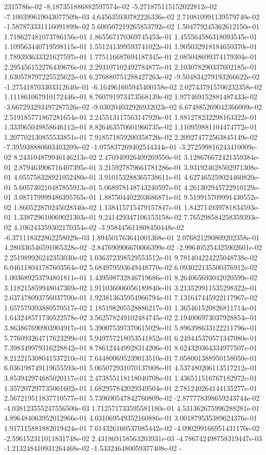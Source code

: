 2315786e-02	-8.187351886882597574e-02	-5.271875115152022812e-02	-7.100399619043077509e-03	4.645635930782226336e-02	2.710810991139579740e-02	-1.587873331116091899e-02	5.600507219265853792e-02	1.504779245362612150e-01	1.718627481073786156e-01	1.865567170369745453e-01	1.455564586318093545e-01	1.109563440719598115e-01	1.551241399593741022e-01	1.905032918184650370e-01	1.789393633321627597e-01	1.775116687694187345e-01	2.085048699374179304e-01	2.295456152276439676e-01	2.293107102492784877e-01	2.103078290337602185e-01	1.630578797225525622e-01	6.276880751288427263e-02	-9.504834279193266622e-02	-1.275418703303312640e-01	-6.164961605945400158e-02	2.027437915706232358e-02	1.111861067910172446e-01	8.760791973473568139e-02	1.977469152881487433e-02	-3.667293293497287526e-02	-9.030204032926932023e-02	6.674885269042366009e-02	2.519185771867281654e-01	2.245513117563147920e-01	1.881278232298163322e-01	1.333965049858646112e-01	8.826463570601966735e-02	1.110959881104474772e-01	1.207702130855533851e-01	7.918571859200358720e-02	2.209274772563845149e-02	-7.395938880603403209e-02	-1.075837269402544344e-01	-3.272599816243410009e-02	8.243104879946146213e-02	2.476940926409269550e-01	3.128676672421359384e-01	2.879463906716407395e-01	3.215927879661781286e-01	3.931924628502971308e-01	4.055758328921052480e-01	3.910153288365738611e-01	4.627465259024460820e-01	5.605730210487855913e-01	5.068978148743240597e-01	4.261302945722910129e-01	3.087179999486395765e-01	1.887504402203686871e-01	9.519915709991430552e-02	1.860522870245028340e-02	1.138415715479157847e-01	1.842714939781834593e-01	1.338729610069021303e-01	9.241429347106153158e-02	7.765298584258359393e-02	4.106243359302170354e-02	-3.958445611808450448e-02	-6.371118322862258029e-03	1.894501763641001368e-01	2.076821290809202358e-01	4.280336546591065328e-02	-2.847690906670066399e-02	-2.996405254325902601e-02	2.251989926242353030e-02	1.036372398529553512e-01	9.781404224225048738e-02	6.046118041787603564e-02	5.684979593649448770e-02	6.093022135500376912e-02	1.003689253794801811e-01	1.439598732846719686e-01	8.264065693042020599e-02	3.118215859948047369e-02	1.911036006056189840e-01	3.213529911535298322e-01	2.637478093756037700e-01	1.923813635954966794e-01	7.131647445922117967e-02	1.657579393880570517e-02	1.185198205528886217e-01	1.365461520826811714e-01	1.643248571730522578e-02	3.562578249102484745e-02	2.194006973037928854e-01	3.863867690903904917e-01	5.390075397370615029e-01	5.896398633122211796e-01	5.776093264717623299e-01	5.949757218053541852e-01	6.249445370571347080e-01	7.398349979316228842e-01	8.786124449928314206e-01	8.624320364334977507e-01	8.212215308041537210e-01	7.644800695239013510e-01	7.058001388950158050e-01	6.036198749119655593e-01	5.065072931070137008e-01	4.537480206113517212e-01	3.853942974685020117e-01	2.473855118118040708e-01	1.436511516767182972e-01	1.357207297735061602e-01	1.682957842029349504e-01	2.781240264144135277e-01	2.567219511837710577e-01	5.739690547842760809e-02	-2.877778398659243744e-02	-4.038123555247556500e-03	1.712571733595581180e-01	4.531362675996288281e-01	4.896484063952012966e-01	4.031069549352160886e-01	3.001879535389624376e-01	1.917115881882019424e-01	7.614326160537085442e-02	-4.090299166951431170e-02	-2.596152311011831748e-02	2.431869158563203931e-03	-4.786742498758319447e-03	-1.213248410931264468e-02	-1.533246480059377408e-02	-